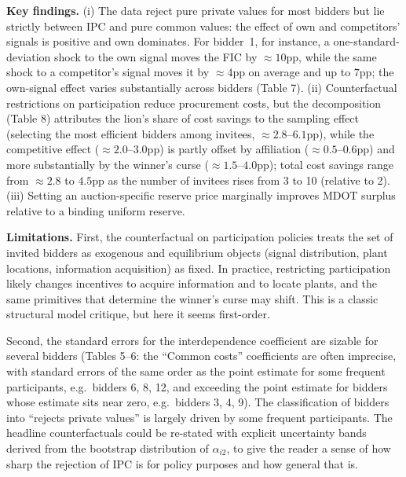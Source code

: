 \documentclass{article}
\begin{document}
\textbf{Key findings.} (i) The data reject pure private values for most bidders but lie strictly between IPC and pure common values: the effect of own and competitors' signals is positive and own dominates. For bidder~1, for instance, a one-standard-deviation shock to the own signal moves the FIC by $\approx 10$pp, while the same shock to a competitor's signal moves it by $\approx 4$pp on average and up to $7$pp; the own-signal effect varies substantially across bidders (Table 7). (ii) Counterfactual restrictions on participation reduce procurement costs, but the decomposition (Table 8) attributes the lion's share of cost savings to the sampling effect (selecting the most efficient bidders among invitees, $\approx 2.8$--$6.1$pp), while the competitive effect ($\approx 2.0$--$3.0$pp) is partly offset by affiliation ($\approx 0.5$--$0.6$pp) and more substantially by the winner's curse ($\approx 1.5$--$4.0$pp); total cost savings range from $\approx 2.8$ to $4.5$pp as the number of invitees rises from 3 to 10 (relative to 2). (iii) Setting an auction-specific reserve price marginally improves MDOT surplus relative to a binding uniform reserve.

\textbf{Limitations.}
First, the counterfactual on participation policies treats the set of invited bidders as exogenous and equilibrium objects (signal distribution, plant locations, information acquisition) as fixed. In practice, restricting participation likely changes incentives to acquire information \citep{LevinSmith1994} and to locate plants, and the same primitives that determine the winner's curse may shift. This is a classic structural model critique, but here it seems first-order.

Second, the standard errors for the interdependence coefficient are sizable for several bidders (Tables 5--6: the ``Common costs'' coefficients are often imprecise, with standard errors of the same order as the point estimate for some frequent participants, e.g.\ bidders 6, 8, 12, and exceeding the point estimate for bidders whose estimate sits near zero, e.g.\ bidders 3, 4, 9). The classification of bidders into ``rejects private values'' is largely driven by some frequent participants. The headline counterfactuals could be re-stated with explicit uncertainty bands derived from the bootstrap distribution of $\alpha_{i2}$, to give the reader a sense of how sharp the rejection of IPC is for policy purposes and how general that is.
\end{document}
